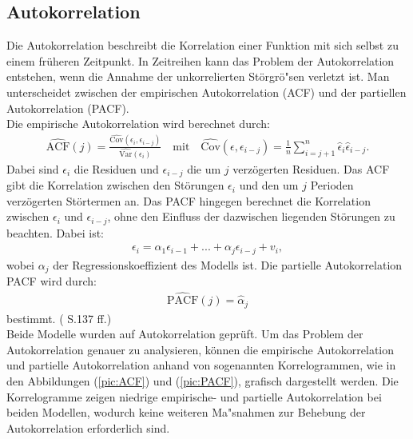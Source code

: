 \documentclass[12pt]{scrreprt}
\begin{document}
\subsection{Autokorrelation}
Die Autokorrelation beschreibt die Korrelation einer Funktion mit sich selbst zu einem früheren Zeitpunkt. In Zeitreihen kann das Problem der Autokorrelation entstehen, wenn die Annahme der unkorrelierten Störgrö"sen verletzt ist. Man unterscheidet zwischen der empirischen Autokorrelation (ACF) und der partiellen Autokorrelation (PACF).\\
Die empirische Autokorrelation wird berechnet durch:
\begin{align}
\widehat{\text{ACF}}(j)=\frac{\widehat{\text{Cov}}(\epsilon_{i},\epsilon_{i-j})}{\widehat{\text{Var}}(\epsilon_{i})} \quad \text{mit} \quad \widehat{\text{Cov}}(\epsilon,\epsilon_{i-j})=\frac{1}{n}\sum_{i=j+1}^{n}\hat{\epsilon}_{i}\hat{\epsilon}_{i-j}.
\end{align}
Dabei sind $\epsilon_{i}$ die Residuen und $\epsilon_{i-j}$ die um $j$ verzögerten Residuen. Das ACF gibt die Korrelation zwischen den Störungen $\epsilon_{i}$ und den um $j$ Perioden verzögerten Störtermen an. Das PACF hingegen berechnet die Korrelation zwischen $\epsilon_{i}$ und $\epsilon_{i-j}$, ohne den Einfluss der dazwischen liegenden Störungen zu beachten. Dabei ist:
\begin{align}
\epsilon_{i}=\alpha_{1}\epsilon_{i-1}+...+\alpha_{j}\epsilon_{i-j}
+v_{i},
\end{align}
wobei $\alpha_{j}$ der Regressionskoeffizient des Modells ist. Die partielle Autokorrelation PACF wird durch:
\begin{align}
\widehat{\text{PACF}}(j)=\hat{\alpha}_{j}
\end{align}
bestimmt. (\cite{fahrmeir2007regression} S.137 ff.)\\
Beide Modelle wurden auf Autokorrelation geprüft. Um das Problem der Autokorrelation genauer zu analysieren, können die empirische Autokorrelation und partielle Autokorrelation anhand von sogenannten Korrelogrammen, wie in den Abbildungen (\ref{pic:ACF}) und (\ref{pic:PACF}), grafisch dargestellt werden. Die  Korrelogramme zeigen niedrige empirische- und partielle Autokorrelation bei beiden Modellen, wodurch keine weiteren Ma"snahmen zur Behebung der Autokorrelation erforderlich sind.
\end{document}
